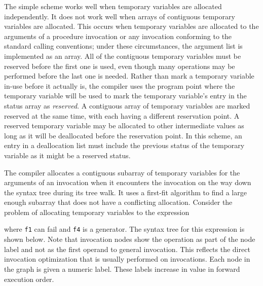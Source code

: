 The simple scheme works well when temporary variables are allocated
independently. It does not work well when arrays of contiguous
temporary variables are allocated. This occurs when temporary
variables are allocated to the arguments of a procedure invocation or
any invocation conforming to the standard calling conventions; under
these circumstances, the argument list is implemented as an array. All
of the contiguous temporary variables must be reserved before the
first one is used, even though many operations may be performed before
the last one is needed. Rather than mark a temporary variable in-use
before it actually is, the compiler uses the program point where the
temporary variable will be used to mark the temporary variable's entry
in the status array as \textit{reserved}. A contiguous array of
temporary variables are marked reserved at the same time, with each
having a different reservation point. A reserved temporary variable
may be allocated to other intermediate values as long as it will be
deallocated before the reservation point. In this scheme, an entry in
a deallocation list must include the previous status of the temporary
variable as it might be a reserved status.

The compiler allocates a contiguous subarray of temporary variables
for the arguments of an invocation when it encounters the invocation
on the way down the syntax tree during its tree walk. It uses a
first-fit algorithm to find a large enough subarray that does not have
a conflicting allocation. Consider the problem of allocating temporary
variables to the expression


\noindent where \texttt{f1} can fail and \texttt{f4} is a
generator. The syntax tree for this expression is shown below. Note
that invocation nodes show the operation as part of the node label and
not as the first operand to general invocation. This reflects the
direct invocation optimization that is usually performed on
invocations. Each node in the graph is given a numeric label. These
labels increase in value in forward execution order.


